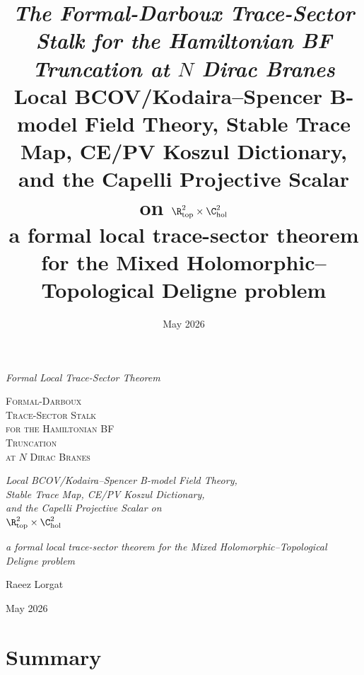 \documentclass[11pt]{memoir}
\title{\texorpdfstring{\textit{The Formal-Darboux Trace-Sector Stalk for the Hamiltonian BF Truncation at $N$ Dirac Branes}\\[0.5em]\large Local BCOV/Kodaira--Spencer B-model Field Theory, Stable Trace Map, CE/PV Koszul Dictionary, and the Capelli Projective Scalar on $\R^2_{\mathrm{top}}\times\C^2_{\mathrm{hol}}$\\[0.3em]\normalsize a formal local trace-sector theorem for the Mixed Holomorphic--Topological Deligne problem}{The Formal-Darboux Trace-Sector Stalk for the Hamiltonian BF Truncation at N Dirac Branes: local BCOV/Kodaira-Spencer B-model field theory, stable trace map, CE/PV Koszul dictionary, and the Capelli projective scalar on R2 top x C2 hol --- a formal local trace-sector theorem for the Mixed Holomorphic-Topological Deligne problem}}
\date{May 2026}
\begin{document}
\label{ssec:open-operator-modular-lift}

\begin{titlingpage}
\vspace*{3cm}
\begin{center}

{\large\itshape Formal Local Trace-Sector Theorem}

\vspace{1.5cm}

{\HUGE\scshape Formal-Darboux\\
Trace-Sector Stalk\\
for the Hamiltonian BF\\
Truncation\\
at $N$ Dirac Branes}

\vspace{1.5cm}

{\Large\itshape Local BCOV/Kodaira--Spencer B-model Field Theory,\\
Stable Trace Map, CE/PV Koszul Dictionary,\\
and the Capelli Projective Scalar on\\
$\R^2_{\mathrm{top}}\times\C^2_{\mathrm{hol}}$}

\vspace{1cm}

{\normalsize\itshape a formal local trace-sector theorem for the Mixed
Holomorphic--Topological Deligne problem}

\vspace{2cm}

{\large Raeez Lorgat}

\vspace{2cm}

{\normalsize May 2026}

\end{center}
\end{titlingpage}

  

  \section*{Summary}
\end{document}
